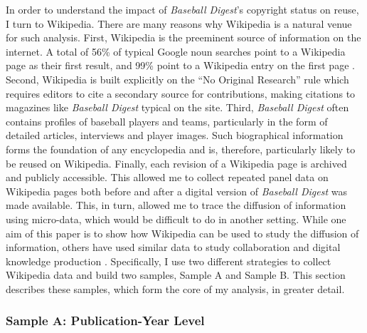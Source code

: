 \documentclass[11pt]{article}
\begin{document}
In order to understand the impact of \emph{Baseball Digest}'s copyright status on reuse, I turn to Wikipedia. There are many reasons why Wikipedia is a natural venue for such analysis. First, Wikipedia is the preeminent source of information on the internet. A total of 56\% of typical Google noun searches point to a Wikipedia page as their first result, and 99\% point to a Wikipedia entry on the first page \citep{silverwood-cope_wikipedia:_2012}. Second, Wikipedia is built explicitly on the ``No Original Research'' rule which requires editors to cite a secondary source for contributions, making citations to magazines like \emph{Baseball Digest} typical on the site. Third, \emph{Baseball Digest} often contains profiles of baseball players and teams, particularly in the form of detailed articles, interviews and player images. Such biographical information forms the foundation of any encyclopedia \citep{greenstein_experts_2014} and is, therefore, particularly likely to be reused on Wikipedia. Finally, each revision of a Wikipedia page is archived and publicly accessible. This allowed me to collect repeated panel data on Wikipedia pages both before and after a digital version of \emph{Baseball Digest} was made available. This, in turn, allowed me to trace the diffusion of information using micro-data, which would be difficult to do in another setting. While one aim of this paper is to show how Wikipedia can be used to study the diffusion of information, others have used similar data to study collaboration and digital knowledge production \citep{zhang_group_2010, greenstein_is_2012, nagaraj_wiki-pages_2009, algan_cooperation_2013, gorbatai_social_2012, aaltonen_cumulative_2013}. Specifically, I use two different strategies to collect Wikipedia data and build two samples, Sample A and Sample B. This section describes these samples, which form the core of my analysis, in greater detail.

\subsubsection{Sample A: Publication-Year Level}
\end{document}
